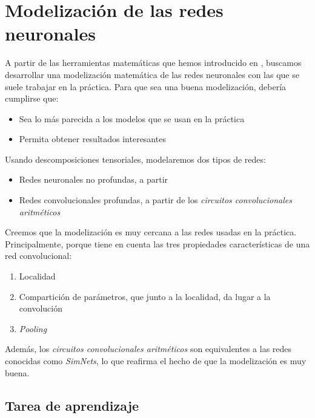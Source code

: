 \chapter{Modelización de las redes neuronales} \label{ch:modelizacion}

A partir de las herramientas matemáticas que hemos introducido en , buscamos desarrollar una modelización matemática de las redes neuronales con las que se suele trabajar en la práctica. Para que sea una buena modelización, debería cumplirse que:

\begin{itemize}
    \item Sea lo más parecida a los modelos que se usan en la práctica
    \item Permita obtener resultados interesantes
\end{itemize}

Usando descomposiciones tensoriales, modelaremos dos tipos de redes:

\begin{itemize}
    \item Redes neuronales no profundas, a partir
    \item Redes convolucionales profundas, a partir de los \textit{circuitos convolucionales aritméticos}
\end{itemize}

Creemos que la modelización es muy cercana a las redes usadas en la práctica. Principalmente, porque tiene en cuenta las tres propiedades características de una red convolucional:

\begin{enumerate}
    \item Localidad
    \item Compartición de parámetros, que junto a la localidad, da lugar a la convolución
    \item \textit{Pooling}
\end{enumerate}

Además, los \textit{circuitos convolucionales aritméticos} son equivalentes a las redes conocidas como \textit{SimNets}, lo que reafirma el hecho de que la modelización es muy buena.

\section{Tarea de aprendizaje}


